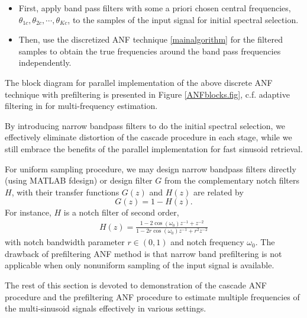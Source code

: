 \documentclass{UCF_ETD}
\begin{document}
\begin{itemize}

\item First, apply band pass filters with some a priori chosen central frequencies, $\theta_{1c},\theta_{2c}, \cdots, \theta_{Kc}$, to the samples of the input signal for initial spectral selection.

\item Then, use the  discretized ANF technique \eqref{mainalgorithm}  for  the filtered samples to obtain the true frequencies around the band pass frequencies independently.
%
\end{itemize}
The block diagram for  parallel implementation of the above
discrete ANF technique with  prefiltering  is presented in Figure  \ref{ANFblocks.fig}, c.f. adaptive filtering in \cite{larsson01} for  multi-frequency estimation.

By introducing narrow bandpass filters to do the initial spectral selection, we effectively eliminate distortion of the cascade procedure in each stage, while we
still embrace the benefits of the parallel implementation for fast sinusoid retrieval.




  For uniform sampling procedure, %
   we may design  narrow bandpass filters directly (using MATLAB fdesign) or design filter $G$ from the complementary notch filters $H$,
 with their transfer functions $G(z)$ and $H(z)$ are related by
  $$G(z)=1-H(z).$$
For instance, $H$ is a notch filter of second order,
\begin{eqnarray}\label{notchparameter}
H(z)= \frac{1 -2\cos(\omega_0)z^{-1}+ z^{-2} }{1 -2r\cos(\omega_0)z^{-1} + r^2z^{-2}}
\end{eqnarray}
 with notch bandwidth parameter $r\in (0, 1)$  and notch frequency  $\omega_0$.
The drawback of prefiltering ANF method  is that narrow band prefiltering is not applicable when only
 nonuniform sampling of the input signal is available.


The rest of this section is devoted to demonstration of the cascade ANF procedure and the prefiltering ANF procedure
 to estimate  multiple frequencies
of the multi-sinusoid signals effectively in various settings.
\end{document}
